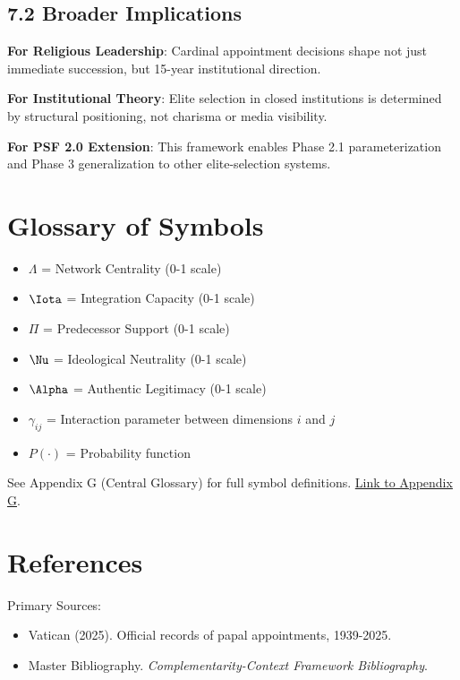 \documentclass[11pt]{article}
\begin{document}
\subsection{7.2 Broader Implications}

\textbf{For Religious Leadership}: Cardinal appointment decisions shape not just immediate succession, but 15-year institutional direction.

\textbf{For Institutional Theory}: Elite selection in closed institutions is determined by structural positioning, not charisma or media visibility.

\textbf{For PSF 2.0 Extension}: This framework enables Phase 2.1 parameterization and Phase 3 generalization to other elite-selection systems.

\section*{Glossary of Symbols}

\begin{itemize}
\item $\Lambda$ = Network Centrality (0-1 scale)
\item $\Iota$ = Integration Capacity (0-1 scale)
\item $\Pi$ = Predecessor Support (0-1 scale)
\item $\Nu$ = Ideological Neutrality (0-1 scale)
\item $\Alpha$ = Authentic Legitimacy (0-1 scale)
\item $\gamma_{ij}$ = Interaction parameter between dimensions $i$ and $j$
\item $P(\cdot)$ = Probability function
\end{itemize}

See Appendix G (Central Glossary) for full symbol definitions. \href{https://github.com/FehrAdvice-Partners-AG/complementarity-context-framework/appendices/G_glossary.tex}{Link to Appendix G}.

\section*{References}

\noindent
Primary Sources:
\begin{itemize}
\item Vatican (2025). Official records of papal appointments, 1939-2025.
\item \nocite{bcm_master} Master Bibliography. \textit{Complementarity-Context Framework Bibliography}.
\end{itemize}
\end{document}
